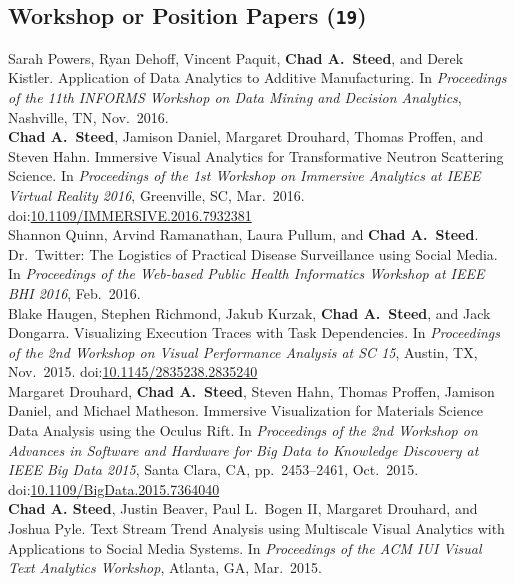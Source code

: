 \documentclass[11pt, letterpaper]{article}
\newcommand{\years}[1]{\marginnote{\scriptsize #1}}
\begin{document}
\subsection*{Workshop or Position Papers (\texttt{19})}

\begin{sloppypar}
\noindent\years{2016}Sarah Powers, Ryan Dehoff, Vincent Paquit,
\textbf{Chad A.\ Steed}, and Derek Kistler. Application of Data Analytics
to Additive Manufacturing.
In \emph{Proceedings of the 11th INFORMS Workshop on Data Mining and
Decision Analytics}, Nashville, TN, Nov.\ 2016.\\
\years{2016}\textbf{Chad A.\ Steed}, Jamison Daniel, Margaret
Drouhard, Thomas Proffen, and Steven Hahn. Immersive Visual Analytics for
Transformative Neutron Scattering Science.
In \emph{Proceedings of the 1st Workshop on Immersive Analytics at IEEE Virtual
Reality 2016}, Greenville, SC, Mar.\ 2016. doi:\href{https://doi.org/10.1109/IMMERSIVE.2016.7932381}
{10.1109/IMMERSIVE.2016.7932381}\\
\years{2016}Shannon Quinn, Arvind Ramanathan, Laura Pullum, and
\textbf{Chad A.\ Steed}. Dr.\ Twitter: The Logistics of Practical Disease
Surveillance using Social Media.
In \emph{Proceedings of the Web-based Public Health Informatics Workshop at
IEEE BHI 2016}, Feb.\ 2016.\\
\years{2015}Blake Haugen, Stephen Richmond, Jakub Kurzak,
\textbf{Chad A.\ Steed}, and Jack Dongarra. Visualizing Execution Traces
with Task Dependencies.
In \emph{Proceedings of the 2nd Workshop on Visual Performance Analysis at SC 15}, Austin, TX, Nov.\ 2015.
doi:\href{http://dx.doi.org/10.1145/2835238.2835240}
{10.1145/2835238.2835240}\\
\years{2015}Margaret Drouhard, \textbf{Chad A.\ Steed}, Steven Hahn,
Thomas Proffen, Jamison Daniel, and Michael Matheson. Immersive Visualization
for Materials Science Data Analysis using the Oculus Rift.
In \emph{Proceedings of the 2nd Workshop on Advances in Software and Hardware for Big Data to Knowledge Discovery at IEEE Big Data 2015}, Santa Clara, CA, pp.\ 2453--2461, Oct.\ 2015. doi:\href{http://dx.doi.org/10.1109/BigData.2015.7364040}{10.1109/BigData.2015.7364040}\\
\years{2015}\textbf{Chad A. Steed}, Justin Beaver, Paul L.\ Bogen II,
Margaret Drouhard, and Joshua Pyle.  Text Stream Trend Analysis using
Multiscale Visual Analytics with Applications to Social Media Systems.
In \emph{Proceedings of the ACM IUI Visual Text Analytics Workshop}, Atlanta,
GA, Mar.\ 2015.\\

\end{sloppypar}
\end{document}
